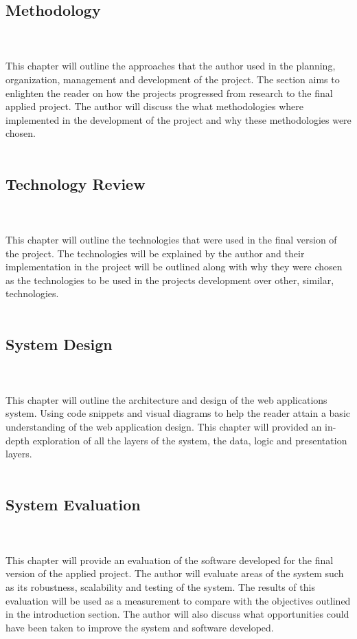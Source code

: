 \subsection{Methodology}\\ \\
This chapter will outline the approaches that the author used in the planning, organization, management and development of the project. The section aims to enlighten the reader on how the projects progressed from research to the final applied project. The author will discuss the what methodologies where implemented in the development of the project and why these methodologies were chosen. \\ \\
\subsection{Technology Review} \\ \\
This chapter will outline the technologies that were used in the final version of the project. The technologies will be explained by the author and their implementation in the project will be outlined along with why they were chosen as the technologies to be used in the projects development over other, similar, technologies. \\ \\
\subsection{System Design} \\ \\
This chapter will outline the architecture and design of the web applications
system. Using code snippets and visual diagrams to help the reader attain a basic
understanding of the web application design. This chapter will provided an in-depth exploration of all the layers of the system, the data, logic and presentation layers. \\ \\
\subsection{System Evaluation} \\ \\
This chapter will provide an evaluation of the software developed for the final version of the applied project. The author will evaluate areas of the system such as its robustness, scalability and testing of the system. The results of this evaluation will be used as a measurement to compare with the objectives outlined in the introduction section. The author will also discuss what opportunities could have been taken to improve the system and software developed. \\ \\
